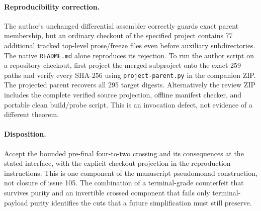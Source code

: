 \documentclass[11pt]{article}
\newcommand{\nm}[1]{\nolinkurl{#1}}
\begin{document}
\paragraph{Reproducibility correction.}
The author's unchanged differential assembler correctly guards exact parent membership, but an ordinary checkout of the specified project contains 77 additional tracked top-level prose/freeze files even before auxiliary subdirectories. The native \nm{README.md} alone reproduces its rejection. To run the author script on a repository checkout, first project the merged subproject onto the exact 259 paths and verify every SHA-256 using \nm{project-parent.py} in the companion ZIP. The projected parent recovers all 295 target digests. Alternatively the review ZIP includes the complete verified source projection, offline manifest checker, and portable clean build/probe script. This is an invocation defect, not evidence of a different theorem.
\paragraph{Disposition.}
Accept the bounded pre-final four-to-two crossing and its consequences at the stated interface, with the explicit checkout projection in the reproduction instructions. This is one component of the manuscript pseudomonad construction, not closure of issue 105. The combination of a terminal-grade counterfeit that survives purity and an invertible crossed component that fails only terminal-payload purity identifies the cuts that a future simplification must still preserve.
\end{document}
